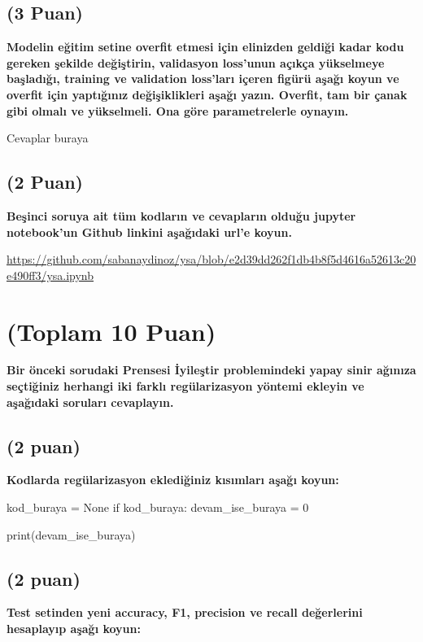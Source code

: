 \documentclass[11pt]{article}
\begin{document}
\subsection{(3 Puan)} \textbf{Modelin eğitim setine overfit etmesi için elinizden geldiği kadar kodu gereken şekilde değiştirin, validasyon loss'unun açıkça yükselmeye başladığı, training ve validation loss'ları içeren figürü aşağı koyun ve overfit için yaptığınız değişiklikleri aşağı yazın. Overfit, tam bir çanak gibi olmalı ve yükselmeli. Ona göre parametrelerle oynayın.}

Cevaplar buraya

\begin{comment}
\begin{figure}[ht!]
    \centering
    \texttt{[image: mypicturehere.png]}
    \caption{Buraya açıklama yazın}
    \label{fig:my_pic}
\end{figure}
\end{comment}

\subsection{(2 Puan)} \textbf{Beşinci soruya ait tüm kodların ve cevapların olduğu jupyter notebook'un Github linkini aşağıdaki url'e koyun.}

\url{https://github.com/sabanaydinoz/ysa/blob/e2d39dd262f1db4b8f5d4616a52613c20e490ff3/ysa.ipynb}

\section{(Toplam 10 Puan)} \textbf{Bir önceki sorudaki Prensesi İyileştir problemindeki yapay sinir ağınıza seçtiğiniz herhangi iki farklı regülarizasyon yöntemi ekleyin ve aşağıdaki soruları cevaplayın.} 

\subsection{(2 puan)} \textbf{Kodlarda regülarizasyon eklediğiniz kısımları aşağı koyun:} 

\begin{python}
kod_buraya = None
if kod_buraya:
    devam_ise_buraya = 0

print(devam_ise_buraya)
\end{python}

\subsection{(2 puan)} \textbf{Test setinden yeni accuracy, F1, precision ve recall değerlerini hesaplayıp aşağı koyun:}
\end{document}
